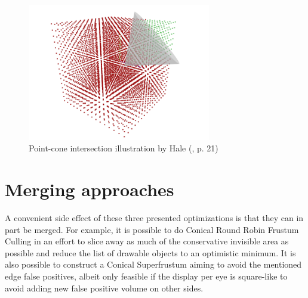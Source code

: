 \begin{figure}[h!]
  \centering
  \includegraphics[height=6cm]{pictures/hale_cone}
  \caption{Point-cone intersection illustration by Hale (\cite{Hale.2018}, p. 21)} \label{fig:hale_cone}
\end{figure}

\section{Merging approaches}
A convenient side effect of these three presented optimizations is that they can in part be merged. For example, it is possible to do Conical Round Robin Frustum Culling in an effort to slice away as much of the conservative invisible area as possible and reduce the list of drawable objects to an optimistic minimum. It is also possible to construct a Conical Superfrustum aiming to avoid the mentioned edge false positives, albeit only feasible if the display per eye is square-like to avoid adding new false positive volume on other sides.
